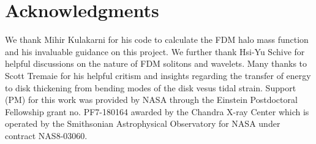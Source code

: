 \documentclass[usenatbib]{mnras}
\begin{document}
\section*{Acknowledgments}
We thank Mihir Kulakarni for his code to calculate the FDM halo mass function and his invaluable guidance on this project. We further thank Hsi-Yu Schive for helpful discussions on the nature of FDM solitons and wavelets. Many thanks to Scott Tremaie for his helpful critism and insights regarding the transfer of energy to disk thickening from bending modes of the disk vesus tidal strain. Support (PM) for this work was provided by NASA through the Einstein Postdoctoral Fellowship grant no. PF7-180164 awarded by the Chandra X-ray Center which is operated by the Smithsonian Astrophysical Observatory for NASA under contract NAS8-03060. 




 
\end{document}
